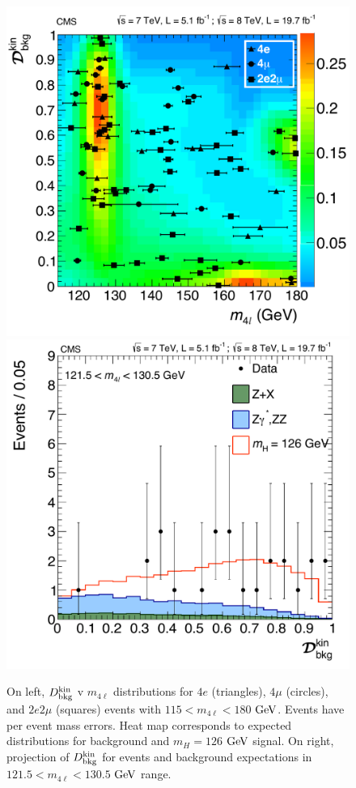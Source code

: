 \begin{figure}[htbp]
\begin{center}
\includegraphics[width=.45\linewidth]{HiggsDiscovery/figures/KD_vs_m4l_lowMass_Signal.pdf}
\includegraphics[width=.45\linewidth]{HiggsDiscovery/figures/KDPeak.pdf}
\caption[Observed $D_{\rm{bkg}}^{\rm{kin}}$ Distributions for Low Mass $4\ell$ Events With Signal Expectations]{On left, $D_{\rm{bkg}}^{\rm{kin}}$ v $m_{4\ell}$ distributions for $4e$ (triangles), $4\mu$ (circles), and $2e2\mu$ (squares) events with $115 < m_{4\ell} < 180$ $\rm{GeV}$. Events have per event mass errors. Heat map corresponds to expected distributions for background and $m_H = 126$ $\rm{GeV}$ signal. On right, projection of $D_{\rm{bkg}}^{\rm{kin}}$ for events and background expectations in $121.5 < m_{4\ell} < 130.5$ $\rm{GeV}$ range.}
\label{fig:Dbkg_2D_Results_Peak}
\end{center}
\end{figure}

